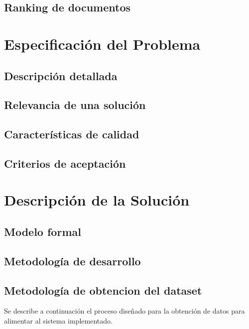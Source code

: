 \documentclass[upright, contnum]{umemoria}
\begin{document}
\section{Ranking de documentos}
\label{sec-2.5}



\chapter{Especificación del Problema}
\label{sec-3}

\section{Descripción detallada}
\label{sec-3.1}

\section{Relevancia de una solución}
\label{sec-3.2}

\section{Características de calidad}
\label{sec-3.3}

\section{Criterios de aceptación}
\label{sec-3.4}


\chapter{Descripción de la Solución}
\label{sec-4}

\section{Modelo formal}
\label{sec-4.1}

\section{Metodología de desarrollo}
\label{sec-4.2}

\section{Metodología de obtencion del dataset}
\label{sec-4.3}


Se describe a continuación el proceso diseñado para la obtención de
datos para alimentar al sistema implementado.
\end{document}
